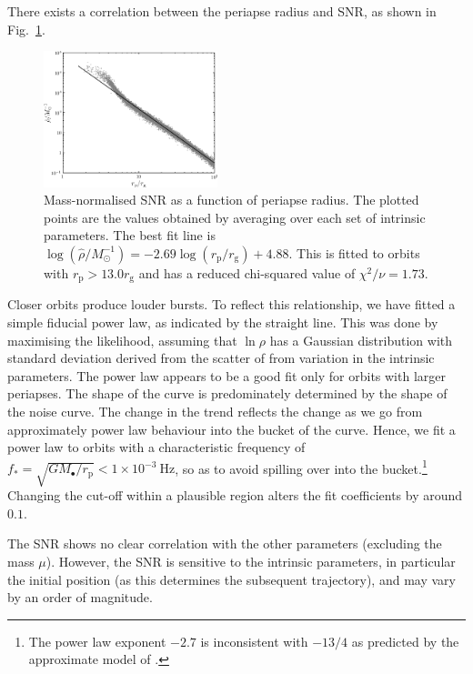 \documentclass[useAMS,usedcolumn,usegraphicx,usenatbib]{mn2e}
\newcommand{\figref}[1]{Fig.~\ref{fig:#1}}
\newcommand{\units}[1]{\ensuremath{~\mathrm{#1}}}
\newcommand{\sub}[1]{\ensuremath{_\mathrm{#1}}}
\begin{document}
There exists a correlation between the periapse radius and SNR, as shown in \figref{SNR}.
\begin{figure}
  \begin{center}
  \includegraphics[width=0.45\textwidth]{Fig_SNR}
    \caption{Mass-normalised SNR as a function of periapse radius. The plotted points are the values obtained by averaging over each set of intrinsic parameters. The best fit line is $\log(\hat{\rho}/M_\odot^{-1}) = -2.69\log(r\sub{p}/r\sub{g}) + 4.88$. This is fitted to orbits with $r\sub{p} >  13.0 r\sub{g}$ and has a reduced chi-squared value of $\chi^2/\nu = 1.73$.}
    \label{fig:SNR}
  \end{center}
\end{figure}
Closer orbits produce louder bursts. To reflect this relationship, we have fitted a simple fiducial power law, as indicated by the straight line. This was done by maximising the likelihood, assuming that $\ln \rho$ has a Gaussian distribution with standard deviation derived from the scatter of from variation in the intrinsic parameters. The power law appears to be a good fit only for orbits with larger periapses. The shape of the curve is predominately determined by the shape of the noise curve. The change in the trend reflects the change as we go from approximately power law behaviour into the bucket of the curve. Hence, we fit a power law to orbits with a characteristic frequency of $f_\ast = \sqrt{GM_\bullet/r\sub{p}} < 1 \times 10^{-3}\units{Hz}$, so as to avoid spilling over into the bucket.\footnote{The power law exponent $-2.7$ is inconsistent with $-13/4$ as predicted by the approximate model of \citet{Hopman2007}.} Changing the cut-off within a plausible region alters the fit coefficients by around $0.1$.

The SNR shows no clear correlation with the other parameters (excluding the mass $\mu$). However, the SNR is sensitive to the intrinsic parameters, in particular the initial position (as this determines the subsequent trajectory), and may vary by an order of magnitude.
\end{document}
